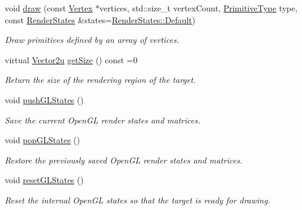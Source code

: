 \begin{DoxyCompactItemize}
void \hyperlink{classsf_1_1_render_target_a976bc94057799eb9f8a18ac5fdfd9b73}{draw} (const \hyperlink{classsf_1_1_vertex}{Vertex} $\ast$vertices, std\+::size\+\_\+t vertex\+Count, \hyperlink{group__graphics_ga5ee56ac1339984909610713096283b1b}{Primitive\+Type} type, const \hyperlink{classsf_1_1_render_states}{Render\+States} \&states=\hyperlink{classsf_1_1_render_states_ad29672df29f19ce50c3021d95f2bb062}{Render\+States\+::\+Default})
\begin{DoxyCompactList}\small\item\em Draw primitives defined by an array of vertices. \end{DoxyCompactList}\item 
virtual \hyperlink{classsf_1_1_vector2}{Vector2u} \hyperlink{classsf_1_1_render_target_a2e5ade2457d9fb4c4907ae5b3d9e94a5}{get\+Size} () const =0
\begin{DoxyCompactList}\small\item\em Return the size of the rendering region of the target. \end{DoxyCompactList}\item 
void \hyperlink{classsf_1_1_render_target_a8d1998464ccc54e789aaf990242b47f7}{push\+G\+L\+States} ()
\begin{DoxyCompactList}\small\item\em Save the current Open\+GL render states and matrices. \end{DoxyCompactList}\item 
void \hyperlink{classsf_1_1_render_target_ad5a98401113df931ddcd54c080f7aa8e}{pop\+G\+L\+States} ()
\begin{DoxyCompactList}\small\item\em Restore the previously saved Open\+GL render states and matrices. \end{DoxyCompactList}\item 
void \hyperlink{classsf_1_1_render_target_aac7504990d27dada4bfe3c7866920765}{reset\+G\+L\+States} ()
\begin{DoxyCompactList}\small\item\em Reset the internal Open\+GL states so that the target is ready for drawing. \end{DoxyCompactList}\end{DoxyCompactItemize}
